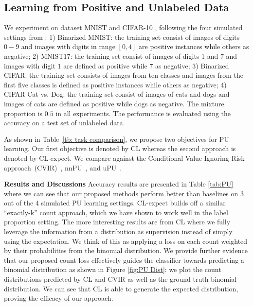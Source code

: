\documentclass{article}
\begin{document}
\vspace{0.8em}
\subsection{Learning from Positive and Unlabeled Data}
We experiment on dataset MNIST and CIFAR-10 \citep{2009CIFAR}, following the four simulated settings from \citet{garg2021mixture}:
1) Binarized MNIST: the training set consist of images of digits $0-9$ and images with digits in range $[0, 4]$ are positive instances while others as negative;
2) MNIST17: the training set consist of images of digits $1$ and $7$ and images with digit $1$ are defined as positive while $7$ as negative;
3) Binarized CIFAR: the training set consists of images from ten classes and images from the first five classes is defined as positive instances while others as negative;
4) CIFAR Cat vs. Dog: the training set consist of images of cats and dogs and images of cats are defined as positive while dogs as negative.
The mixture proportion is $0.5$ in all experiments. 
The performance is evaluated using the accuracy on a test set of unlabeled data. 


As shown in Table~\ref{tb: task comparison}, we propose two objectives for PU learning. Our first objective is denoted by CL whereas the second approach is denoted by CL-expect.
We compare against the Conditional Value Ignoring Risk approach~(CVIR)~\cite{garg2021mixture},
nnPU~\cite{kiryo2017positive}, and uPU~\cite{pmlr-v37-plessis15}. 


\textbf{Results and Discussions} Accuracy results are presented in Table \ref{tab:PU} where we can see that
our proposed methods perform better than baselines on $3$ out of the $4$ simulated PU learning settings. 
CL-expect builds off a similar ``exactly-k'' count approach, which we have shown to work well in the label proportion setting. 
The more interesting results are from CL
where we fully leverage the information from a distribution as supervision instead of simply using the expectation.
We think of this as applying a loss on each count weighted by their probabilities from the binomial distribution. 
We provide further evidence that our proposed count loss effectively guides the classifier towards predicting a binomial distribution
as shown in Figure \ref{fig:PU Dist}: 
we plot the count distributions predicted by CL and CVIR as well as the ground-truth binomial distribution.
We can see that CL is able to generate the expected distribution, proving the efficacy of our approach.
\end{document}
